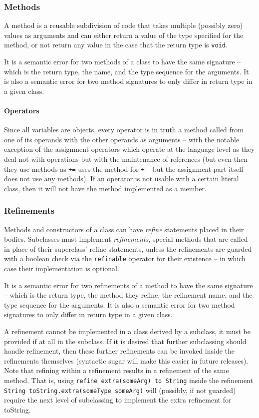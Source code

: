 \subsubsection{Methods}
A method is a reusable subdivision of code that takes multiple (possibly zero) values as arguments and can either return a value of the type specified for the method, or not return any value in the case that the return type is \verb!void!.

It is a semantic error for two methods of a class to have the same signature -- which is the return type, the name, and the type sequence for the arguments. It is also a semantic error for two method signatures to only differ in return type in a given class.

\paragraph{Operators}
Since all variables are objects, every operator is in truth a method called from one of its operands with the other operands as arguments -- with the notable exception of the assignment operators which operate at the language level as they deal not with operations but with the maintenance of references (but even then they use methods as \verb!+=! uses the method for \verb!+! -- but the assignment part itself does not use any methods). If an operator is not usable with a certain literal class, then it will not have the method implemented as a member.

\subsubsection{Refinements}
Methods and constructors of a class can have \textit{refine} statements placed in their bodies. Subclasses must implement \textit{refinements}, special methods that are called in place of their superclass' refine statements, unless the refinements are guarded with a boolean check via the \verb!refinable! operator for their existence -- in which case their implementation is optional.

It is a semantic error for two refinements of a method to have the same signature -- which is the return type, the method they refine, the refinement name, and the type sequence for the arguments. It is also a semantic error for two method signatures to only differ in return type in a given class.

A refinement cannot be implemented in a class derived by a subclass, it must be provided if at all in the subclass. If it is desired that further subclassing should handle refinement, then these further refinements can be invoked inside the refinements themselves (syntactic sugar will make this easier in future releases). Note that refining within a refinement results in a refinement of the same method. That is, using \verb!refine extra(someArg) to String! inside the refinement \verb!String toString.extra(someType someArg)! will (possibly, if not guarded) require the next level of subclassing to implement the extra refinement for toString.

